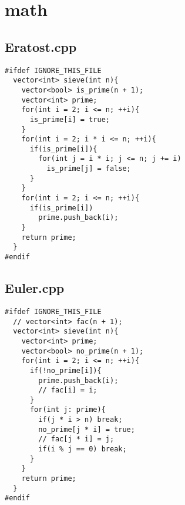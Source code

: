 \documentclass[UTF8, a4paper, titlepage, twoside]{ctexart}
\begin{document}
\clearpage
\section{math}
\subsection{Eratost.cpp}
\begin{verbatim}
#ifdef IGNORE_THIS_FILE
  vector<int> sieve(int n){
    vector<bool> is_prime(n + 1);
    vector<int> prime;
    for(int i = 2; i <= n; ++i){
      is_prime[i] = true;
    }
    for(int i = 2; i * i <= n; ++i){
      if(is_prime[i]){
        for(int j = i * i; j <= n; j += i)
          is_prime[j] = false;
      }
    }
    for(int i = 2; i <= n; ++i){
      if(is_prime[i])
        prime.push_back(i);
    }
    return prime;
  }
#endif
\end{verbatim}

\subsection{Euler.cpp}
\begin{verbatim}
#ifdef IGNORE_THIS_FILE
  // vector<int> fac(n + 1);
  vector<int> sieve(int n){
    vector<int> prime;
    vector<bool> no_prime(n + 1);
    for(int i = 2; i <= n; ++i){
      if(!no_prime[i]){
        prime.push_back(i);
        // fac[i] = i;
      }
      for(int j: prime){
        if(j * i > n) break;
        no_prime[j * i] = true;
        // fac[j * i] = j;
        if(i % j == 0) break;
      }
    }
    return prime;
  }
#endif
\end{verbatim}
\end{document}
